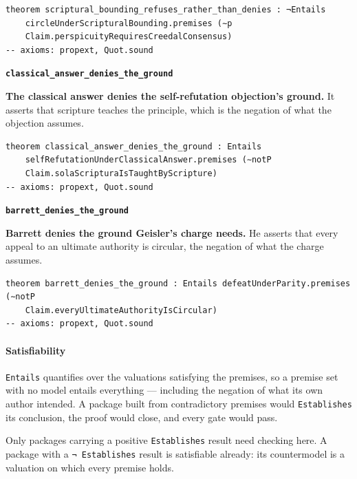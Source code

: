 \documentclass[11pt]{article}
\begin{document}
{\small\begin{verbatim}
theorem scriptural_bounding_refuses_rather_than_denies : ¬Entails
    circleUnderScripturalBounding.premises (∼p
    Claim.perspicuityRequiresCreedalConsensus)
-- axioms: propext, Quot.sound
\end{verbatim}}
\par\medskip\noindent\textbf{\texttt{classical\_\allowbreak{}answer\_\allowbreak{}denies\_\allowbreak{}the\_\allowbreak{}ground}}\par\nobreak\noindent
\textbf{The classical answer denies the self-refutation objection's ground.} It asserts that scripture teaches the principle, which is the negation of what the objection assumes.

{\small\begin{verbatim}
theorem classical_answer_denies_the_ground : Entails
    selfRefutationUnderClassicalAnswer.premises (∼notP
    Claim.solaScripturaIsTaughtByScripture)
-- axioms: propext, Quot.sound
\end{verbatim}}
\par\medskip\noindent\textbf{\texttt{barrett\_\allowbreak{}denies\_\allowbreak{}the\_\allowbreak{}ground}}\par\nobreak\noindent
\textbf{Barrett denies the ground Geisler's charge needs.} He asserts that every appeal to an ultimate authority is circular, the negation of what the charge assumes.

{\small\begin{verbatim}
theorem barrett_denies_the_ground : Entails defeatUnderParity.premises (∼notP
    Claim.everyUltimateAuthorityIsCircular)
-- axioms: propext, Quot.sound
\end{verbatim}}
\paragraph*{Satisfiability}
\leavevmode\par
\texttt{Entails} quantifies over the valuations satisfying the premises, so a premise set with no model entails everything — including the negation of what its own author intended. A package built from contradictory premises would \texttt{Establishes} its conclusion, the proof would close, and every gate would pass.

Only packages carrying a positive \texttt{Establishes} result need checking here. A package with a \texttt{¬ Establishes} result is satisfiable already: its countermodel is a valuation on which every premise holds.
\end{document}
